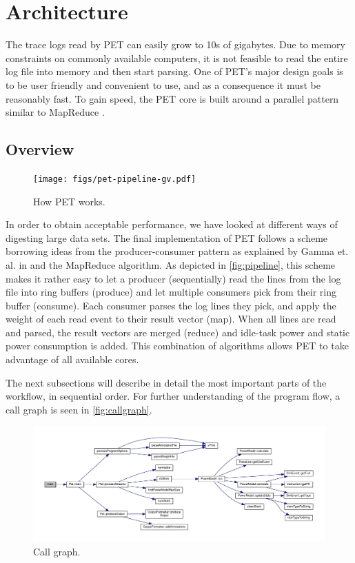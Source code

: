\section{Architecture}

The trace logs read by PET can easily grow to 10s of gigabytes. Due to memory
constraints on commonly available computers, it is not feasible to read the
entire log file into memory and then start parsing. One of PET's major design
goals is to be user friendly and convenient to use, and as a consequence it must
be reasonably fast. To gain speed, the PET core is built around a parallel
pattern similar to MapReduce \cite{dean2008mapreduce}.


\subsection{Overview}

\begin{figure}[ht]
    \texttt{[image: figs/pet-pipeline-gv.pdf]}
    \caption{How PET works.}
    \label{fig:pipeline}
\end{figure}

In order to obtain acceptable performance, we have looked at different ways of
digesting large data sets. The final implementation of PET follows a scheme
borrowing ideas from the producer-consumer pattern as explained by Gamma et. al.
in \cite{designpatterns} and the MapReduce algorithm. As depicted in
\autoref{fig:pipeline}, this scheme makes it rather easy to let a producer
(sequentially) read the lines from the log file into ring buffers (produce) and
let multiple consumers pick from their ring buffer (consume). Each consumer
parses the log lines they pick, and apply the weight of each read event to their
result vector (map). When all lines are read and parsed, the result vectors are
merged (reduce) and idle-task power and static power consumption is added. This
combination of algorithms allows PET to take advantage of all available cores.

The next subsections will describe in detail the most important parts of the
workflow, in sequential order. For further understanding of the program flow, a
call graph is seen in \autoref{fig:callgraph}.

\begin{figure}
    \includegraphics[width=\textwidth]{figs/maincallgraph.pdf}
    \caption{Call graph.}
    \label{fig:callgraph}
\end{figure}


